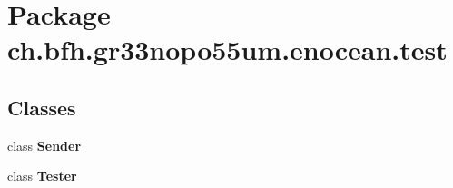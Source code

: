 \section{Package ch.\+bfh.\+gr33nopo55um.\+enocean.\+test}
\label{namespacech_1_1bfh_1_1gr33nopo55um_1_1enocean_1_1test}
\subsection*{Classes}
\begin{DoxyCompactItemize}
\item 
class {\bf Sender}
\item 
class {\bf Tester}
\end{DoxyCompactItemize}
